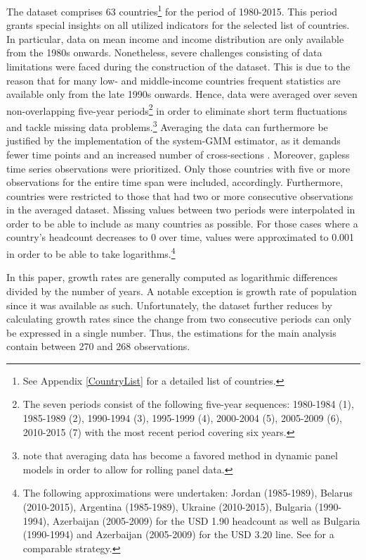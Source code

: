 \documentclass[12pt, a4paper]{article}
\begin{document}
The dataset comprises 63 countries\footnote{See Appendix \ref{CountryList} for a detailed list of countries.} for the period of 1980-2015. This period grants special insights on all utilized indicators for the selected list of countries. In particular, data on mean income and income distribution are only available from the 1980s onwards. Nonetheless, severe challenges consisting of data limitations were faced during the construction of the dataset. This is due to the reason that for many low- and middle-income countries frequent statistics are available only from the late 1990s onwards. Hence, data were averaged over seven non-overlapping five-year periods\footnote{The seven periods consist of the following five-year sequences: 1980-1984 (1), 1985-1989 (2), 1990-1994 (3), 1995-1999 (4), 2000-2004 (5), 2005-2009 (6), 2010-2015 (7) with the most recent period covering six years.} in order to eliminate short term fluctuations and tackle missing data problems.\footnote{ note that averaging data has become a favored method in dynamic panel models in order to allow for rolling panel data.} Averaging the data can furthermore be justified by the implementation of the system-GMM estimator, as it demands fewer time points and an increased number of cross-sections \cite{seven2016}. Moreover, gapless time series observations were prioritized. Only those countries with five or more observations for the entire time span were included, accordingly. Furthermore, countries were restricted to those that had two or more consecutive observations in the averaged dataset. Missing values between two periods were interpolated in order to be able to include as many countries as possible. For those cases where a country's headcount decreases to 0 over time, values were approximated to 0.001 in order to be able to take logarithms.\footnote{The following approximations were undertaken: Jordan (1985-1989), Belarus (2010-2015), Argentina (1985-1989), Ukraine (2010-2015), Bulgaria (1990-1994), Azerbaijan (2005-2009) for the USD 1.90 headcount as well as Bulgaria (1990-1994) and Azerbaijan (2005-2009) for the USD 3.20 line. See  for a comparable  strategy.}

In this paper, growth rates are generally computed as logarithmic differences divided by the number of years. A notable exception is growth rate of population since it was available as such. Unfortunately, the dataset further reduces by calculating growth rates since the change from two consecutive periods can only be expressed in a single number. Thus, the estimations for the main analysis contain between 270 and 268 observations.
\end{document}
